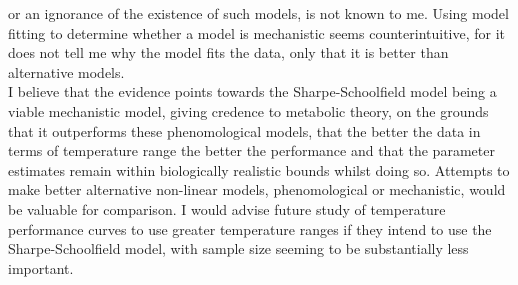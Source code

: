 \documentclass[fontsize=11pt]{scrartcl}\usepackage[]{graphicx}\usepackage[]{color}
\begin{document}
  or an ignorance of the existence of such models, is not known to me. Using model fitting to determine whether a 
  model is mechanistic seems counterintuitive, for it does not tell me why the model fits the data, only that 
  it is better than alternative models. \\
  I believe that the evidence points towards the Sharpe-Schoolfield model being a viable mechanistic model, giving credence
  to metabolic theory, on the grounds that it outperforms 
  these phenomological models, that the better the data in terms of temperature range the better the performance 
  and that the parameter estimates 
  remain within biologically realistic bounds whilst doing so. Attempts to make better alternative non-linear models, 
  phenomological or mechanistic, would be valuable for comparison. I would advise future study of temperature performance curves
  to use greater temperature ranges if they intend to use the Sharpe-Schoolfield model, with sample size seeming to be substantially
  less important. \\
  

  
  
\end{document}
